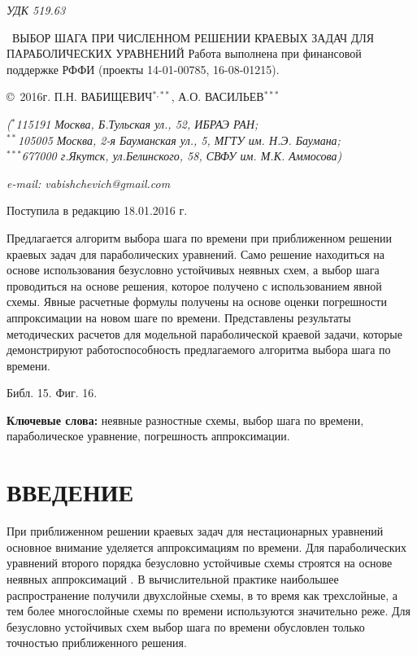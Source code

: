 \documentclass[12pt]{ncc}
\numberwithin{equation}{section}
\begin{document}
\renewcommand\refname{СПИСОК ЛИТЕРАТУРЫ}

{\it УДК 519.63}

\begin{center}

{\bm ~ВЫБОР ШАГА ПРИ ЧИСЛЕННОМ РЕШЕНИИ КРАЕВЫХ ЗАДАЧ ДЛЯ ПАРАБОЛИЧЕСКИХ УРАВНЕНИЙ
{Работа выполнена при финансовой поддержке РФФИ (проекты 14-01-00785, 16-08-01215).} }
\bigskip

{\bm \copyright \ 2016г.  П.Н. ВАБИЩЕВИЧ$^{*,**}$, А.О. ВАСИЛЬЕВ$^{***}$}
\bigskip

{\it ($^{*}$115191 Москва, Б.Тульская ул., 52, ИБРАЭ РАН; \\ 
$^{**}$105005 Москва, 2-я Бауманская ул., 5,  МГТУ им. Н.Э. Баумана; \\ 
$^{***}$677000 г.Якутск, ул.Белинского, 58, СВФУ им. М.К. Аммосова) }

{\it e-mail:  vabishchevich@gmail.com}

Поступила в редакцию 18.01.2016 г.

\bigskip

\end{center}
\bigskip

\parbox{15cm} {{\footnotesize

Предлагается алгоритм выбора шага по времени при приближенном решении
краевых задач для параболических уравнений.
Само решение находиться на основе использования безусловно устойчивых неявных схем, а
выбор шага проводиться на основе решения, которое получено с использованием явной схемы. Явные расчетные формулы получены на основе оценки погрешности
аппроксимации на новом шаге по времени. 
Представлены результаты методических расчетов для модельной
параболической краевой задачи, которые демонстрируют работоспособность 
предлагаемого алгоритма выбора шага по времени. 

Библ. 15. Фиг. 16.

\textbf{Ключевые слова:} неявные разностные схемы, выбор шага по времени, параболическое уравнение, погрешность аппроксимации.
}}

\bigskip

\section*{ВВЕДЕНИЕ}

При приближенном решении краевых задач для нестационарных уравнений основное внимание
\cite{Angermann,Ascher,LeVeque} уделяется аппроксимациям по времени. 
Для параболических уравнений второго порядка безусловно устойчивые схемы строятся на основе
неявных аппроксимаций \cite{Samarskii,SamarskiiGulin,SamarskiiMatusVabishchevich}. 
В вычислительной  практике наибольшее распространение получили двухслойные схемы,
в то время как трехслойные, а тем более многослойные схемы по времени используются значительно реже.
Для безусловно устойчивых схем выбор шага по времени обусловлен только
точностью приближенного решения. 
\end{document}
